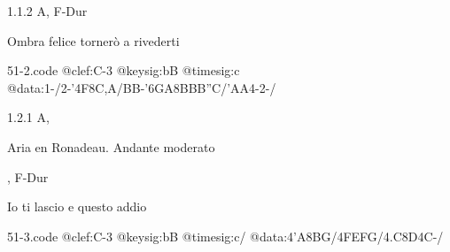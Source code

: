 \documentclass[a4paper, twocolumn, 11pt]{book}
\begin{document}
\newline %
\par 1.1.2  A, F-Dur\newline \begin{footnotesize} Ombra felice tornerò a rivederti \end{footnotesize}  
\begin{filecontents*}{51-2.code}
@clef:C-3
@keysig:bB
@timesig:c
@data:1-/2-'4F8C,A/BB-'6GA8BBB''C/'AA4-2-/
\end{filecontents*}

\newline %
\par 1.2.1  A, \begin{itshape}Aria en Ronadeau. Andante moderato\end{itshape}, F-Dur\newline \begin{footnotesize} Io ti lascio e questo addio \end{footnotesize}  
\begin{filecontents*}{51-3.code}
@clef:C-3
@keysig:bB
@timesig:c/
@data:4'A{8BG}/4FEFG/4.C8D4C-/
\end{filecontents*}
\end{document}
